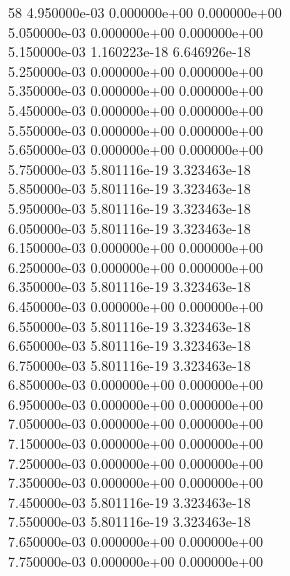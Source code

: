 58	4.950000e-03	0.000000e+00	0.000000e+00	\\ 	5.050000e-03	0.000000e+00	0.000000e+00	\\ 	5.150000e-03	1.160223e-18	6.646926e-18	\\ 	5.250000e-03	0.000000e+00	0.000000e+00	\\ 	5.350000e-03	0.000000e+00	0.000000e+00	\\ 	5.450000e-03	0.000000e+00	0.000000e+00	\\ 	5.550000e-03	0.000000e+00	0.000000e+00	\\ 	5.650000e-03	0.000000e+00	0.000000e+00	\\ 	5.750000e-03	5.801116e-19	3.323463e-18	\\ 	5.850000e-03	5.801116e-19	3.323463e-18	\\ 	5.950000e-03	5.801116e-19	3.323463e-18	\\ 	6.050000e-03	5.801116e-19	3.323463e-18	\\ 	6.150000e-03	0.000000e+00	0.000000e+00	\\ 	6.250000e-03	0.000000e+00	0.000000e+00	\\ 	6.350000e-03	5.801116e-19	3.323463e-18	\\ 	6.450000e-03	0.000000e+00	0.000000e+00	\\ 	6.550000e-03	5.801116e-19	3.323463e-18	\\ 	6.650000e-03	5.801116e-19	3.323463e-18	\\ 	6.750000e-03	5.801116e-19	3.323463e-18	\\ 	6.850000e-03	0.000000e+00	0.000000e+00	\\ 	6.950000e-03	0.000000e+00	0.000000e+00	\\ 	7.050000e-03	0.000000e+00	0.000000e+00	\\ 	7.150000e-03	0.000000e+00	0.000000e+00	\\ 	7.250000e-03	0.000000e+00	0.000000e+00	\\ 	7.350000e-03	0.000000e+00	0.000000e+00	\\ 	7.450000e-03	5.801116e-19	3.323463e-18	\\ 	7.550000e-03	5.801116e-19	3.323463e-18	\\ 	7.650000e-03	0.000000e+00	0.000000e+00	\\ 	7.750000e-03	0.000000e+00	0.000000e+00	\\ \hline
